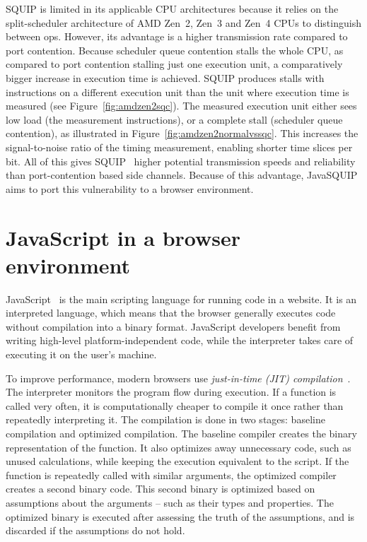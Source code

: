 \documentclass[11pt,
  titlepage=false,
  parskip=half,      %
]{scrreprt}
\begin{document}
SQUIP is limited in its applicable CPU architectures because it relies on the split-scheduler architecture of AMD Zen~2, Zen~3 and Zen~4 CPUs to distinguish between \textmu ops.
However, its advantage is a higher transmission rate compared to port contention.
Because scheduler queue contention stalls the whole CPU, as compared to port contention stalling just one execution unit,
a comparatively bigger increase in execution time is achieved.
SQUIP produces stalls with instructions on a different execution unit than the unit where execution time is measured (see Figure~\ref{fig:amdzen2sqc}).
The measured execution unit either sees low load (the measurement instructions), or a complete stall (scheduler queue contention),
as illustrated in Figure~\ref{fig:amdzen2normalvssqc}.
This increases the signal-to-noise ratio of the timing measurement,
enabling shorter time slices per bit.
All of this gives SQUIP~\cite{squip} higher potential transmission speeds and reliability than port-contention based side channels.
Because of this advantage, JavaSQUIP aims to port this vulnerability to a browser environment.

\section{JavaScript in a browser environment}
\label{sec:javascriptenv}
JavaScript~\cite{javascript} is the main scripting language for running code in a website.
It is an interpreted language, which means that the browser generally executes code without compilation into a binary format.
JavaScript developers benefit from writing high-level platform-independent code,
while the interpreter takes care of executing it on the user's machine.

To improve performance, modern browsers use \textit{just-in-time (JIT) compilation}~\cite{jitcompiler}.
The interpreter monitors the program flow during execution.
If a function is called very often,
it is computationally cheaper to compile it once rather than repeatedly interpreting it.
The compilation is done in two stages: baseline compilation and optimized compilation.
The baseline compiler creates the binary representation of the function.
It also optimizes away unnecessary code, such as unused calculations, while keeping the execution equivalent to the script.
If the function is repeatedly called with similar arguments, the optimized compiler creates a second binary code.
This second binary is optimized based on assumptions about the arguments -- such as their types and properties.
The optimized binary is executed after assessing the truth of the assumptions, and is discarded if the assumptions do not hold.
\end{document}
